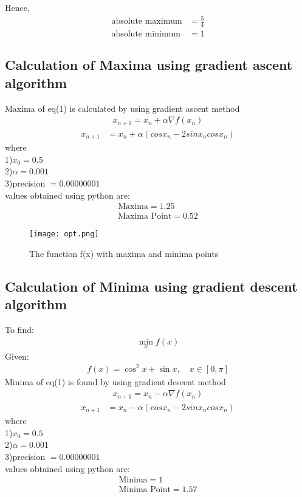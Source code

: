 \documentclass[10pt,twocolumn]{article}
\providecommand{\brak}[1]{\ensuremath{\left(#1\right)}}
\begin{document}
Hence, 
\begin{align}
\text{absolute maximum} & =  \frac{5}{4}\\
\text{absolute minimum} & = 1
\end{align}

\subsection{Calculation of Maxima using gradient ascent algorithm}
Maxima of eq(1) is calculated by using gradient ascent method
\begin{align}
x_{n+1} = x_n + \alpha \nabla f(x_n) 
\end{align}
\begin{align}
x_{n+1} &= x_n + \alpha \brak{cosx_n-2sinx_ncosx_n}
\end{align}
where \\
1)$x_0=0.5$ \\
2)$\alpha=0.001$ \\
3)precision $= 0.00000001$ \\
values obtained using python are:
    \begin{align}
        \boxed{\text{Maxima} = 1.25 }\\
        \boxed{\text{Maxima Point} = 0.52}
    \end{align}
    
\begin{figure}[h!]
\texttt{[image: opt.png]}
\caption{The function f(x) with maxima and minima points}
\end{figure}        

\subsection{Calculation of Minima using gradient descent algorithm}
To find: 
\begin{align}
\min_{x} f(x)
\end{align}  
Given:
\begin{align}
f(x) = \cos^2x + \sin x,\quad x \in [0,\pi] 
\end{align}
Minima of eq(1) is found by using gradient descent method 
\begin{align}
x_{n+1} = x_n - \alpha \nabla f(x_n)
\end{align}
\begin{align}
x_{n+1} &= x_n - \alpha \brak{cosx_n-2sinx_ncosx_n}
\end{align}
where \\
1)$x_0=0.5$ \\
2)$\alpha=0.001$ \\
3)precision $= 0.00000001$ \\
values obtained using python are:
    \begin{align}
        \boxed{\text{Minima} = 1 }\\
        \boxed{\text{Minima Point} = 1.57}
    \end{align}
\end{document}
